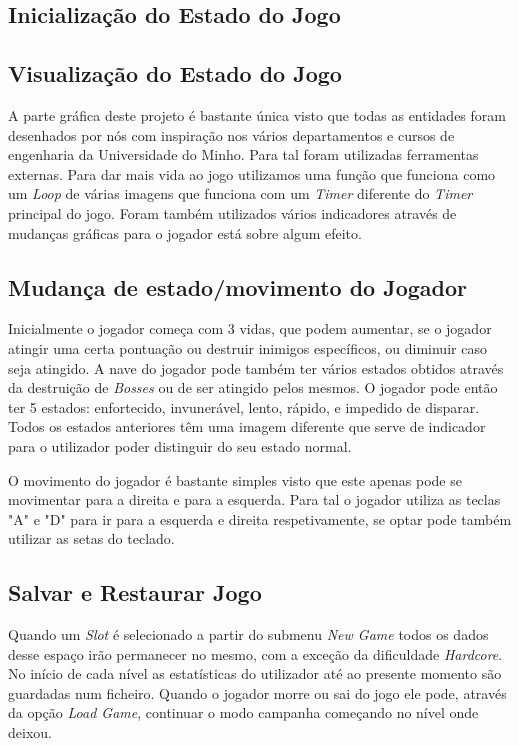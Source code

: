 \documentclass[a4paper,11pt]{article}
\newcommand\tab[1][0.8cm]{\hspace*{#1}}
\begin{document}
\subsection{Inicialização do Estado do Jogo}
\pagebreak

\subsection{Visualização do Estado do Jogo}
 \tab A parte gráfica deste projeto é bastante única visto que todas as entidades foram desenhados por nós com inspiração nos vários departamentos e cursos de engenharia da Universidade do Minho. Para tal foram utilizadas ferramentas externas. Para dar mais vida ao jogo utilizamos uma função que funciona como um \textit{Loop} de várias imagens que funciona com um \textit{Timer} diferente do \textit{Timer} principal do jogo. Foram também utilizados vários indicadores através de mudanças gráficas para o jogador está sobre algum efeito.

\subsection{Mudança de estado/movimento do Jogador}
\tab Inicialmente o jogador começa com 3 vidas, que podem aumentar, se o jogador atingir uma certa pontuação ou destruir inimigos específicos, ou diminuir caso seja atingido. A nave do jogador pode também ter vários estados obtidos através da destruição de \textit{Bosses} ou de ser atingido pelos mesmos. O jogador pode então ter 5 estados: enfortecido, invunerável, lento, rápido, e impedido de disparar. Todos os estados anteriores têm uma imagem diferente que serve de indicador para o utilizador poder distinguir do seu  estado normal. 

\vspace{8pt}
 O movimento do jogador é bastante simples visto que este apenas pode se movimentar para a direita e para a esquerda. Para tal o jogador utiliza as teclas "A" e "D"  para ir para a esquerda e direita respetivamente, se optar pode também utilizar as setas do teclado.

\pagebreak

\subsection{Salvar e Restaurar Jogo}
\tab Quando um \textit{Slot} é selecionado a partir do submenu \textit{New Game} todos os dados desse espaço irão permanecer no mesmo, com a exceção da dificuldade \textit{Hardcore}. No início de cada nível as estatísticas do utilizador até ao presente momento são guardadas num ficheiro. Quando o jogador morre ou sai do jogo ele pode, através da opção \textit{Load Game}, continuar o modo campanha começando no nível onde deixou. 
\pagebreak
\end{document}
